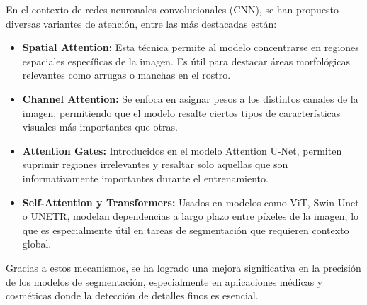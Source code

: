 En el contexto de redes neuronales convolucionales (CNN), se han propuesto diversas variantes de atención, entre las más destacadas están:

\begin{itemize}
    \item \textbf{Spatial Attention:} Esta técnica permite al modelo concentrarse en regiones espaciales específicas de la imagen. Es útil para destacar áreas morfológicas relevantes como arrugas o manchas en el rostro. \parencite{woo2018cbam}
    
    \item \textbf{Channel Attention:} Se enfoca en asignar pesos a los distintos canales de la imagen, permitiendo que el modelo resalte ciertos tipos de características visuales más importantes que otras. \parencite{hu2018senet}
    
    \item \textbf{Attention Gates:} Introducidos en el modelo Attention U-Net, permiten suprimir regiones irrelevantes y resaltar solo aquellas que son informativamente importantes durante el entrenamiento. \parencite{oktay2018attentionunet}
    
    \item \textbf{Self-Attention y Transformers:} Usados en modelos como ViT, Swin-Unet o UNETR, modelan dependencias a largo plazo entre píxeles de la imagen, lo que es especialmente útil en tareas de segmentación que requieren contexto global. \parencite{vaswani2017attention}
\end{itemize}

Gracias a estos mecanismos, se ha logrado una mejora significativa en la precisión de los modelos de segmentación, especialmente en aplicaciones médicas y cosméticas donde la detección de detalles finos es esencial.








